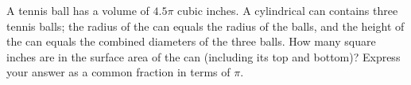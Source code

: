 A tennis ball has a volume of $4.5\pi$ cubic inches. A cylindrical can contains three tennis balls; the radius of the can equals the radius of the balls, and the height of the can equals the combined diameters of the three balls. How many square inches are in the surface area of the can (including its top and bottom)? Express your answer as a common fraction in terms of $\pi$.

